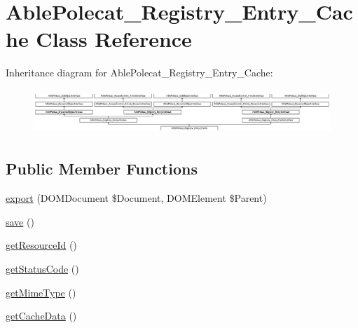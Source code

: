 \hypertarget{class_able_polecat___registry___entry___cache}{}\section{Able\+Polecat\+\_\+\+Registry\+\_\+\+Entry\+\_\+\+Cache Class Reference}
\label{class_able_polecat___registry___entry___cache}
Inheritance diagram for Able\+Polecat\+\_\+\+Registry\+\_\+\+Entry\+\_\+\+Cache\+:\begin{figure}[H]
\begin{center}
\leavevmode
\includegraphics[height=1.707317cm]{class_able_polecat___registry___entry___cache}
\end{center}
\end{figure}
\subsection*{Public Member Functions}
\begin{DoxyCompactItemize}
\item 
\hyperlink{class_able_polecat___registry___entry___cache_a0a05b2e4b3a44390eeb042064e427b1a}{export} (D\+O\+M\+Document \$Document, D\+O\+M\+Element \$Parent)
\item 
\hyperlink{class_able_polecat___registry___entry___cache_afc8a3c62679cf00ade9f15fb2a6d6132}{save} ()
\item 
\hyperlink{class_able_polecat___registry___entry___cache_a0ac412173b2b1d569ef90a1ac095ca5d}{get\+Resource\+Id} ()
\item 
\hyperlink{class_able_polecat___registry___entry___cache_a094778dd1c04fe44626000b47ea0c0bb}{get\+Status\+Code} ()
\item 
\hyperlink{class_able_polecat___registry___entry___cache_ac06e9f7b10fca30eb41e41d4dc108b1c}{get\+Mime\+Type} ()
\item 
\hyperlink{class_able_polecat___registry___entry___cache_a991b958b6b972356b973a9c68306bc4f}{get\+Cache\+Data} ()
\end{DoxyCompactItemize}

